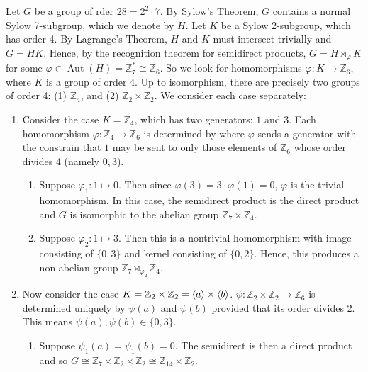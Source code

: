 \documentclass{article}
\begin{document}
\begin{solutions}
	Let $G$ be a group of rder $28 = 2^{2} \cdot 7$. By Sylow's Theorem, $G$ contains a normal Sylow 7-subgroup, which we denote by $H$. Let $K$ be a Sylow 2-subgroup, which has order 4. By Lagrange's Theorem, $H$ and $K$ must intersect trivially and $G = HK$. Hence, by the recognition theorem for semidirect products, $G = H \rtimes_{\varphi} K$ for some $\varphi \in \operatorname{Aut}(H) = \mathbb{Z}_{7}^{\ast} \cong \mathbb{Z}_{6}$. So we look for homomorphisms $\varphi: K \to \mathbb{Z}_{6}$, where $K$ is a group of order 4. Up to isomorphism, there are precisely two groups of order 4: (1) $\mathbb{Z}_{4}$, and (2) $\mathbb{Z}_{2} \times \mathbb{Z}_{2}$. We consider each case separately: 
		\begin{enumerate}[itemsep =-2pt,label = (\Roman{*})]
			\item Consider the case $K = \mathbb{Z}_{4}$, which has two generators: $1$ and $3$. Each homomorphism $\varphi: \mathbb{Z}_{4} \to \mathbb{Z}_{6}$ is determined by where $\varphi$ sends a generator with the constrain that $1$ may be sent to only those elements of $\mathbb{Z}_{6}$ whose order divides 4 (namely $0,3$). 
				\begin{enumerate}[itemsep =-2pt,label = (\roman{*})]
					\item Suppose $\varphi_{1}: 1 \mapsto 0$. Then since $\varphi(3) = 3 \cdot \varphi(1) = 0$, $\varphi$ is the trivial homomorphism. In this case, the semidirect product is the direct product and $G$ is isomorphic to the abelian group $\mathbb{Z}_{7} \times \mathbb{Z}_{4}$. 
					\item Suppose $\varphi_{2}: 1 \mapsto 3$. Then this is a nontrivial homomorphism with image consisting of $\{0,3\}$ and kernel consisting of $\{0,2\}$. Hence, this produces a non-abelian group $\mathbb{Z}_{7} \rtimes_{\varphi_{2}} \mathbb{Z}_{4}$. 
				\end{enumerate}
			\item Now consider the case $K = \mathbb{Z}_{2} \times \mathbb{Z}_{2} = \braket{a} \times \braket{b}$. $\psi: \mathbb{Z}_{2} \times \mathbb{Z}_{2} \to \mathbb{Z}_{6}$ is determined uniquely by $\psi(a)$ and $\psi(b)$ provided that its order divides 2. This means $\psi(a),\psi(b) \in \{0,3\}$. 
				\begin{enumerate}[itemsep =-2pt,label = (\roman{*})]
					\item Suppose $\psi_{1}(a) = \psi_{1}(b) = 0$. The semidirect is then a direct product and so $G \cong \mathbb{Z}_{7} \times \mathbb{Z}_{2} \times \mathbb{Z}_{2} \cong \mathbb{Z}_{14} \times \mathbb{Z}_{2}$. 

\end{enumerate}
\end{enumerate}
\end{solutions}
\end{document}
